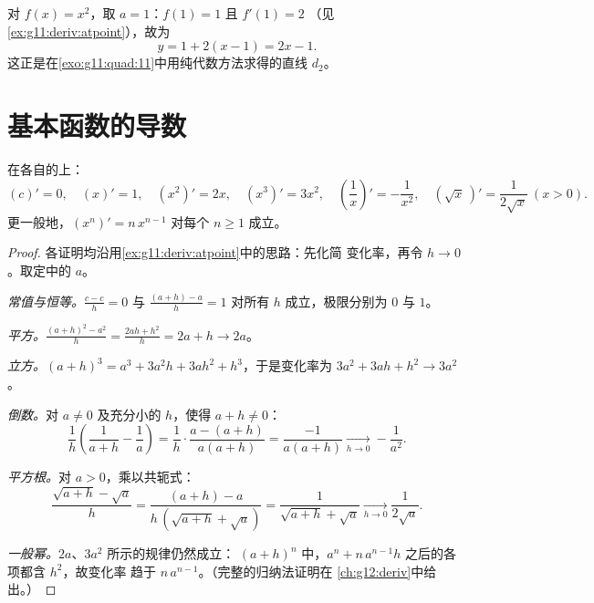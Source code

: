 \begin{example}\label{ex:g11:deriv:tangenteq}
对 $f(x) = x^2$，取 $a = 1$：$f(1) = 1$ 且 $f'(1) = 2$
（见\cref{ex:g11:deriv:atpoint}），故为
\[
y = 1 + 2(x - 1) = 2x - 1 .
\]
这正是在\cref{exo:g11:quad:11}中用纯代数方法求得的直线 $d_2$。
\end{example}

\section{基本函数的导数}

\begin{proposition}\label{prop:g11:deriv:refderivatives}
在各自的上：
\[
(c)' = 0, \quad
(x)' = 1, \quad
(x^2)' = 2x, \quad
(x^3)' = 3x^2, \quad
\left(\frac1x\right)' = -\frac{1}{x^2}, \quad
(\sqrt x\,)' = \frac{1}{2\sqrt x} \ (x > 0).
\]
更一般地，$(x^n)' = n\,x^{n-1}$ 对每个 $n \geq 1$ 成立。
\end{proposition}

\begin{proof}
各证明均沿用\cref{ex:g11:deriv:atpoint}中的思路：先化简
变化率，再令 $h \to 0$。取定中的 $a$。

\emph{常值与恒等。}$\frac{c - c}{h} = 0$ 与
$\frac{(a+h) - a}{h} = 1$ 对所有 $h$ 成立，极限分别为 $0$ 与 $1$。

\emph{平方。}$\frac{(a+h)^2 - a^2}{h} = \frac{2ah + h^2}{h} = 2a + h
\to 2a$。

\emph{立方。}$(a+h)^3 = a^3 + 3a^2h + 3ah^2 + h^3$，于是变化率为
$3a^2 + 3ah + h^2 \to 3a^2$。

\emph{倒数。}对 $a \neq 0$ 及充分小的 $h$，使得
$a + h \neq 0$：
\[
\frac{1}{h}\left(\frac{1}{a+h} - \frac{1}{a}\right)
= \frac{1}{h} \cdot \frac{a - (a+h)}{a(a+h)}
= \frac{-1}{a(a+h)}
\xrightarrow[h \to 0]{} -\frac{1}{a^2}.
\]

\emph{平方根。}对 $a > 0$，乘以共轭式：
\[
\frac{\sqrt{a+h} - \sqrt a}{h}
= \frac{(a + h) - a}{h\,(\sqrt{a+h} + \sqrt a)}
= \frac{1}{\sqrt{a+h} + \sqrt a}
\xrightarrow[h \to 0]{} \frac{1}{2\sqrt a}.
\]

\emph{一般幂。}$2a$、$3a^2$ 所示的规律仍然成立：
$(a+h)^n$ 中，$a^n + n\,a^{n-1}h$ 之后的各项都含 $h^2$，故变化率
趋于 $n\,a^{n-1}$。（完整的归纳法证明在
\cref{ch:g12:deriv}中给出。）
\end{proof}

